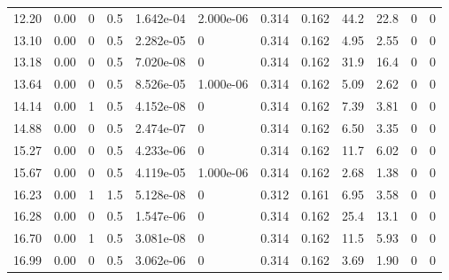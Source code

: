 \documentclass[preview]{standalone}
\begin{document}
{{\begin{tabular}{L{1.2cm}C{1.2cm} C{0.3cm}C{0.5cm} C{1.4cm}C{1.4cm} C{1.4cm}C{1.4cm} C{1.6cm}C{1.6cm} C{1.6cm}C{1.6cm}}
  12.20  &  0.00  & 0     & 0.5 &  1.642e-04  & 2.000e-06  &  0.314&   0.162& 44.2 & 22.8   &  0 & 0  \\ 
  13.10  &  0.00  & 0     & 0.5 &  2.282e-05  & 0  &  0.314&   0.162& 4.95 & 2.55   &  0 & 0  \\ 
  13.18  &  0.00  & 0     & 0.5 &  7.020e-08  & 0  &  0.314&   0.162& 31.9 & 16.4   &  0 & 0  \\ 
  13.64  &  0.00  & 0     & 0.5 &  8.526e-05  & 1.000e-06  &  0.314&   0.162& 5.09 & 2.62   &  0 & 0  \\ 
  14.14  &  0.00  & 1     & 0.5 &  4.152e-08  & 0  &  0.314&   0.162& 7.39 & 3.81   &  0 & 0  \\ 
  14.88  &  0.00  & 0     & 0.5 &  2.474e-07  & 0  &  0.314&   0.162& 6.50 & 3.35   &  0 & 0  \\ 
  15.27  &  0.00  & 0     & 0.5 &  4.233e-06  & 0  &  0.314&   0.162& 11.7 & 6.02   &  0 & 0  \\ 
  15.67  &  0.00  & 0     & 0.5 &  4.119e-05  & 1.000e-06  &  0.314&   0.162& 2.68 & 1.38   &  0 & 0  \\ 
  16.23  &  0.00  & 1     & 1.5 &  5.128e-08  & 0  &  0.312&   0.161& 6.95 & 3.58   &  0 & 0  \\ 
  16.28  &  0.00  & 0     & 0.5 &  1.547e-06  & 0  &  0.314&   0.162& 25.4 & 13.1   &  0 & 0  \\ 
  16.70  &  0.00  & 1     & 0.5 &  3.081e-08  & 0  &  0.314&   0.162& 11.5 & 5.93   &  0 & 0  \\ 
  16.99  &  0.00  & 0     & 0.5 &  3.062e-06  & 0  &  0.314&   0.162& 3.69 & 1.90   &  0 & 0  \\ 
\hline 
\end{tabular} 

}}
\end{document}
